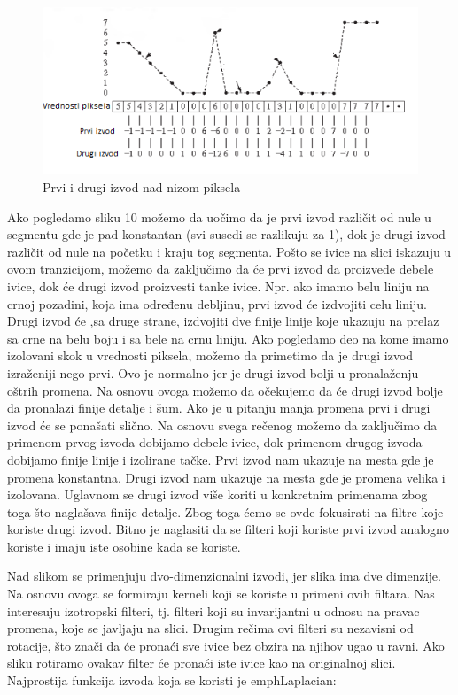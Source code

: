\documentclass[a4paper,12pt,titlepage]{article}
\begin{document}
\begin{figure}[ht!]
\centering
\includegraphics[width=120mm]{img/izvod.png}
\caption{Prvi i drugi izvod nad nizom piksela}
\label{overflow}
\end{figure}

Ako pogledamo sliku 10 možemo da uočimo da je prvi izvod različit od nule u segmentu gde je pad konstantan (svi susedi se razlikuju za 1), dok je drugi izvod različit od nule na početku i kraju tog segmenta. Pošto se ivice na slici iskazuju u ovom tranzicijom, možemo da zaključimo da će prvi izvod da proizvede debele ivice, dok će drugi izvod proizvesti tanke ivice. Npr. ako imamo belu liniju na crnoj pozadini, koja ima određenu debljinu, prvi izvod će izdvojiti celu liniju. Drugi izvod će ,sa druge strane, izdvojiti dve finije linije koje ukazuju na prelaz sa crne na belu boju i sa bele na crnu liniju. Ako pogledamo deo na kome imamo izolovani skok u vrednosti piksela, možemo da primetimo da je drugi izvod izraženiji nego prvi. Ovo je normalno jer je drugi izvod bolji u pronalaženju oštrih promena. Na osnovu ovoga možemo da očekujemo da će drugi izvod bolje da pronalazi finije detalje i šum. Ako je u pitanju manja promena prvi i drugi izvod će se ponašati slično. Na osnovu svega rečenog možemo da zaključimo da primenom prvog izvoda dobijamo debele ivice, dok primenom drugog izvoda dobijamo finije linije i izolirane tačke. Prvi izvod nam ukazuje na mesta gde je promena konstantna. Drugi izvod nam ukazuje na mesta gde je promena velika i izolovana. Uglavnom se drugi izvod više koriti u konkretnim primenama zbog toga što naglašava finije detalje. Zbog toga ćemo se ovde fokusirati na filtre koje koriste drugi izvod. Bitno je naglasiti da se filteri koji koriste prvi izvod analogno koriste i imaju iste osobine kada se koriste.

Nad slikom se primenjuju dvo-dimenzionalni izvodi, jer slika ima dve dimenzije. Na osnovu ovoga se formiraju kerneli koji se koriste u primeni ovih filtara. Nas interesuju izotropski filteri, tj. filteri koji su invarijantni u odnosu na pravac promena, koje se javljaju na slici. Drugim rečima ovi filteri su nezavisni od rotacije, što znači da će pronaći sve ivice bez obzira na njihov ugao u ravni. Ako sliku rotiramo ovakav filter će pronaći iste ivice kao na originalnoj slici. Najprostija funkcija izvoda koja se koristi je emph{Laplacian}:
\end{document}
